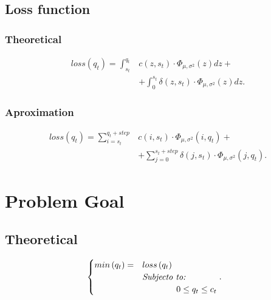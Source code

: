 \documentclass{OptiFlow}
\begin{document}
\subsection{Loss function}
\subsubsection{Theoretical}
\begin{align*}
	loss\left( q_t \right)   = \int_{s_t}^{q_t} &c\left( z,s_t \right) \cdot \Phi_{\mu, \sigma^2}\left( z \right) dz+ \\
										&+ \int_{0}^{s_t} \delta\left( z,s_t \right)\cdot \Phi_{\mu, \sigma^2}\left( z \right) dz  
.\end{align*}

\subsubsection{Aproximation}
\begin{align*}
	loss\left( q_t \right)  = \sum_{i = s_t}^{q_t+step} &c\left( i,s_t \right) \cdot \Phi_{\mu, \sigma^2}\left( i, q_t \right) + \\
	&+ \sum_{j = 0}^{s_t + step} \delta\left( j,s_t \right) \cdot \Phi_{\mu, \sigma^2}\left( j,q_t \right) 
.\end{align*}

\section{Problem Goal}
\subsection{Theoretical}
\begin{align*}
	&\begin{cases}
		min\left( q_t \right) = &loss\left( q_t \right) \\
		&\text{\textit{Subjecto to:}}\\
		&\text{\qquad \qquad} 0 \le q_t \le  c_t
	\end{cases}
.\end{align*}
\end{document}
